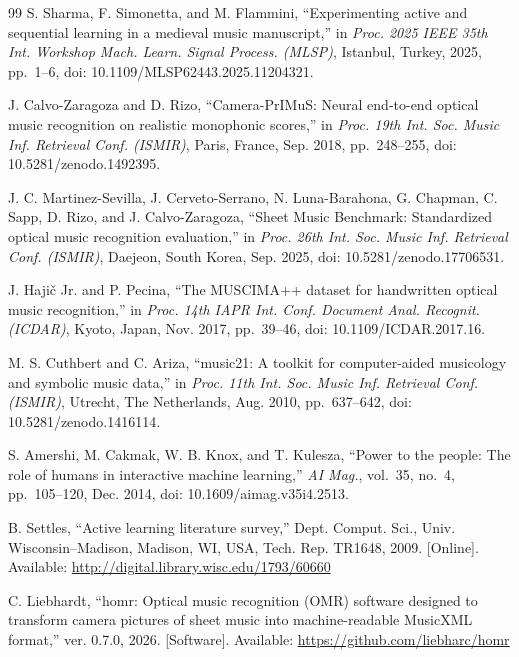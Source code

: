 \documentclass[conference]{IEEEtran}
\begin{document}
\begin{thebibliography}{99}
S. Sharma, F. Simonetta, and M. Flammini, ``Experimenting active and
sequential learning in a medieval music manuscript,'' in \emph{Proc. 2025
IEEE 35th Int. Workshop Mach. Learn. Signal Process. (MLSP)}, Istanbul,
Turkey, 2025, pp.~1--6, doi: 10.1109/MLSP62443.2025.11204321. %

J. Calvo-Zaragoza and D. Rizo, ``Camera-PrIMuS: Neural end-to-end optical
music recognition on realistic monophonic scores,'' in \emph{Proc. 19th Int.
Soc. Music Inf. Retrieval Conf. (ISMIR)}, Paris, France, Sep. 2018,
pp.~248--255, doi: 10.5281/zenodo.1492395. %

J. C. Martinez-Sevilla, J. Cerveto-Serrano, N. Luna-Barahona, G. Chapman,
C. Sapp, D. Rizo, and J. Calvo-Zaragoza, ``Sheet Music Benchmark:
Standardized optical music recognition evaluation,'' in \emph{Proc. 26th Int.
Soc. Music Inf. Retrieval Conf. (ISMIR)}, Daejeon, South Korea, Sep. 2025,
doi: 10.5281/zenodo.17706531. %

J. Haji\v{c} Jr. and P. Pecina, ``The MUSCIMA++ dataset for handwritten
optical music recognition,'' in \emph{Proc. 14th IAPR Int. Conf. Document
Anal. Recognit. (ICDAR)}, Kyoto, Japan, Nov. 2017, pp.~39--46,
doi: 10.1109/ICDAR.2017.16. %

M. S. Cuthbert and C. Ariza, ``music21: A toolkit for computer-aided
musicology and symbolic music data,'' in \emph{Proc. 11th Int. Soc. Music
Inf. Retrieval Conf. (ISMIR)}, Utrecht, The Netherlands, Aug. 2010,
pp.~637--642, doi: 10.5281/zenodo.1416114. %

S. Amershi, M. Cakmak, W. B. Knox, and T. Kulesza, ``Power to the people:
The role of humans in interactive machine learning,'' \emph{AI Mag.},
vol.~35, no.~4, pp.~105--120, Dec. 2014, doi: 10.1609/aimag.v35i4.2513. %

B. Settles, ``Active learning literature survey,'' Dept. Comput. Sci., Univ.
Wisconsin--Madison, Madison, WI, USA, Tech. Rep. TR1648, 2009. [Online].
Available: \url{http://digital.library.wisc.edu/1793/60660} %

C. Liebhardt, ``homr: Optical music recognition (OMR) software designed to
transform camera pictures of sheet music into machine-readable MusicXML
format,'' ver. 0.7.0, 2026. [Software]. Available:
\url{https://github.com/liebharc/homr} %


\end{thebibliography}
\end{document}
